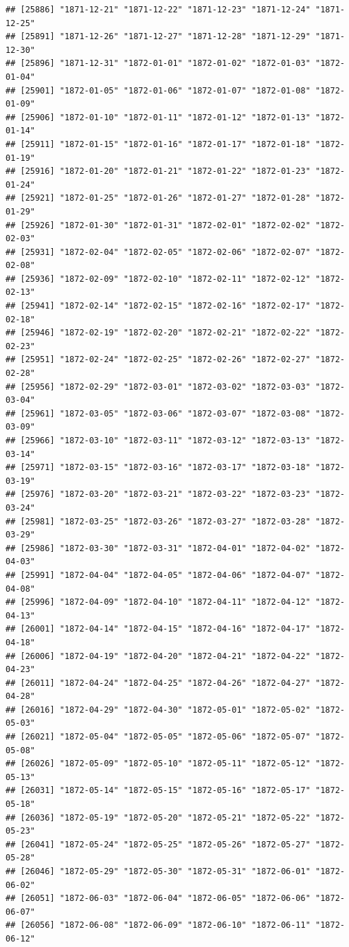 \documentclass{article}\usepackage[]{graphicx}\usepackage[]{color}
\makeatletter
\newenvironment{kframe}{%
 \def\at@end@of@kframe{}%
 \ifinner\ifhmode%
  \def\at@end@of@kframe{\end{minipage}}%
  \begin{minipage}{\columnwidth}%
 \fi\fi%
 \def\FrameCommand##1{\hskip\@totalleftmargin \hskip-\fboxsep
 \colorbox{shadecolor}{##1}\hskip-\fboxsep
     \hskip-\linewidth \hskip-\@totalleftmargin \hskip\columnwidth}%
 \MakeFramed {\advance\hsize-\width
   \@totalleftmargin\z@ \linewidth\hsize
   \@setminipage}}%
 {\par\unskip\endMakeFramed%
 \at@end@of@kframe}
\newenvironment{knitrout}{}{} %
\makeatother
\begin{document}
\begin{description}
\begin{knitrout}
\begin{kframe}
\begin{verbatim}
## [25886] "1871-12-21" "1871-12-22" "1871-12-23" "1871-12-24" "1871-12-25"
## [25891] "1871-12-26" "1871-12-27" "1871-12-28" "1871-12-29" "1871-12-30"
## [25896] "1871-12-31" "1872-01-01" "1872-01-02" "1872-01-03" "1872-01-04"
## [25901] "1872-01-05" "1872-01-06" "1872-01-07" "1872-01-08" "1872-01-09"
## [25906] "1872-01-10" "1872-01-11" "1872-01-12" "1872-01-13" "1872-01-14"
## [25911] "1872-01-15" "1872-01-16" "1872-01-17" "1872-01-18" "1872-01-19"
## [25916] "1872-01-20" "1872-01-21" "1872-01-22" "1872-01-23" "1872-01-24"
## [25921] "1872-01-25" "1872-01-26" "1872-01-27" "1872-01-28" "1872-01-29"
## [25926] "1872-01-30" "1872-01-31" "1872-02-01" "1872-02-02" "1872-02-03"
## [25931] "1872-02-04" "1872-02-05" "1872-02-06" "1872-02-07" "1872-02-08"
## [25936] "1872-02-09" "1872-02-10" "1872-02-11" "1872-02-12" "1872-02-13"
## [25941] "1872-02-14" "1872-02-15" "1872-02-16" "1872-02-17" "1872-02-18"
## [25946] "1872-02-19" "1872-02-20" "1872-02-21" "1872-02-22" "1872-02-23"
## [25951] "1872-02-24" "1872-02-25" "1872-02-26" "1872-02-27" "1872-02-28"
## [25956] "1872-02-29" "1872-03-01" "1872-03-02" "1872-03-03" "1872-03-04"
## [25961] "1872-03-05" "1872-03-06" "1872-03-07" "1872-03-08" "1872-03-09"
## [25966] "1872-03-10" "1872-03-11" "1872-03-12" "1872-03-13" "1872-03-14"
## [25971] "1872-03-15" "1872-03-16" "1872-03-17" "1872-03-18" "1872-03-19"
## [25976] "1872-03-20" "1872-03-21" "1872-03-22" "1872-03-23" "1872-03-24"
## [25981] "1872-03-25" "1872-03-26" "1872-03-27" "1872-03-28" "1872-03-29"
## [25986] "1872-03-30" "1872-03-31" "1872-04-01" "1872-04-02" "1872-04-03"
## [25991] "1872-04-04" "1872-04-05" "1872-04-06" "1872-04-07" "1872-04-08"
## [25996] "1872-04-09" "1872-04-10" "1872-04-11" "1872-04-12" "1872-04-13"
## [26001] "1872-04-14" "1872-04-15" "1872-04-16" "1872-04-17" "1872-04-18"
## [26006] "1872-04-19" "1872-04-20" "1872-04-21" "1872-04-22" "1872-04-23"
## [26011] "1872-04-24" "1872-04-25" "1872-04-26" "1872-04-27" "1872-04-28"
## [26016] "1872-04-29" "1872-04-30" "1872-05-01" "1872-05-02" "1872-05-03"
## [26021] "1872-05-04" "1872-05-05" "1872-05-06" "1872-05-07" "1872-05-08"
## [26026] "1872-05-09" "1872-05-10" "1872-05-11" "1872-05-12" "1872-05-13"
## [26031] "1872-05-14" "1872-05-15" "1872-05-16" "1872-05-17" "1872-05-18"
## [26036] "1872-05-19" "1872-05-20" "1872-05-21" "1872-05-22" "1872-05-23"
## [26041] "1872-05-24" "1872-05-25" "1872-05-26" "1872-05-27" "1872-05-28"
## [26046] "1872-05-29" "1872-05-30" "1872-05-31" "1872-06-01" "1872-06-02"
## [26051] "1872-06-03" "1872-06-04" "1872-06-05" "1872-06-06" "1872-06-07"
## [26056] "1872-06-08" "1872-06-09" "1872-06-10" "1872-06-11" "1872-06-12"

\end{verbatim}
\end{kframe}
\end{knitrout}
\end{description}
\end{document}
